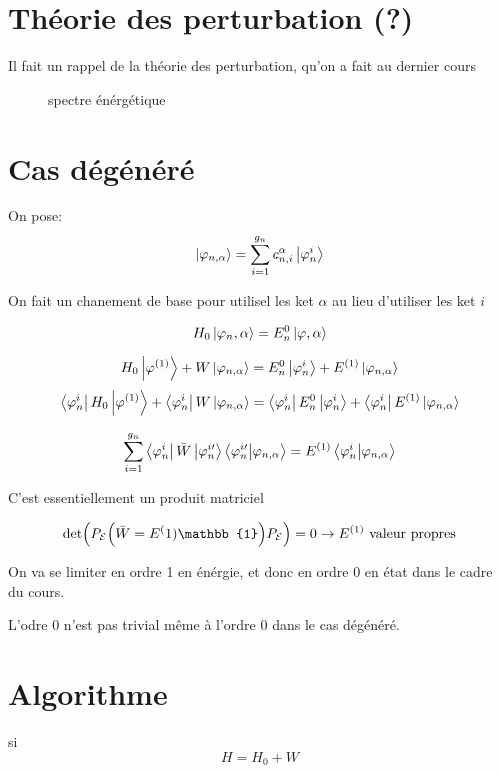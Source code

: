 



\section*{Théorie des perturbation (?)}

Il fait un rappel de la théorie des perturbation, qu'on a fait au dernier cours

\begin{figure}[ht]
    \centering
    \caption{spectre énérgétique}
    \label{fig:spectre-énérgétique}
\end{figure}

\section*{Cas dégénéré}

On pose:
$$\ket{\varphi_{n,\alpha}} = \sum_{i=1}^{g_n} c^\alpha_{n,i} \ket{\varphi_n^i}$$ 

On fait un chanement de base pour utilisel les ket $\alpha$ au lieu d'utiliser les ket $i$  

$$H_0\ket{\varphi_n,\alpha} = E_n^0\ket{\varphi, \alpha}$$ 
	
$$H_0\ket{\varphi^{(1)}} + W\ket{\varphi_{n,\alpha}}= E_n^0\ket{\varphi_n^i} + E^{(1)} \ket{\varphi_{n,\alpha}}$$ 
$$\bra{\varphi^i_n}H_0\ket{\varphi^{(1)}} + \bra{\varphi^i_n}W\ket{\varphi_{n,\alpha}}= \bra{\varphi^i_n}E_n^0\ket{\varphi_n^i} + \bra{\varphi^i_n}E^{(1)} \ket{\varphi_{n,\alpha}}$$ 


$$\sum_{i=1}^{g_n} \bra{\varphi^i_n}\bar W \ket{\varphi_n^{i\prime}}\bra{\varphi_n^{i\prime}}\ket{\varphi_{n,\alpha}}= E^{(1)}\braket{\varphi_n^i}{\varphi_{n,\alpha}}$$ 

C'est essentiellement un produit matriciel 


$$\det(P_{\mathcal{E}}\qty(\bar W = E^(1)\mathbb{1})P_{\mathcal{E} }) = 0 \to E^{(1)} \text{ valeur propres}$$ 

On va se limiter en ordre 1 en énérgie, et donc en ordre 0 en état dans le cadre du cours.

L'odre 0 n'est pas trivial même à l'ordre 0 dans le cas dégénéré.

\section*{Algorithme}

si $$H = H_{0}+W$$

